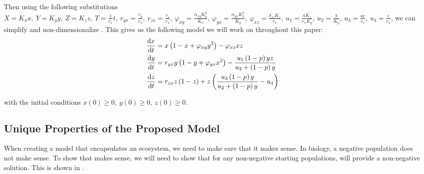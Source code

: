 Then using the following substitutions $X=K_xx,\ Y=K_yy,\ Z=K_zz,\ T=\frac{1}{r_x}t,\ r_{yx}=\frac{r_y}{r_x},\ r_{zx}=\frac{r_z}{r_x},\ \varphi_{xy}=\frac{\alpha_{xy}K_y^2}{K_x},\ \varphi_{yx}=\frac{\alpha_{yx}K_x^2}{K_y},\ \varphi_{xz}=\frac{\delta_{xz}K_z}{r_x},\ u_1=\frac{aK_z}{r_xK_y},\ u_2=\frac{b}{K_y},\ u_3=\frac{ac}{r_x},\ u_4=\frac{e}{r_x}$, we can simplify and non-dimensionalize . This gives us the following model we will work on throughout this paper:
\begin{subequations}\label{model:rayla-ephraim}
    \begin{align}
        \diff[]{x}{t} &= x\left(1-x+\varphi_{xy}y^2\right)-\varphi_{xz}xz
        \label{eq:rayla-ephraim-x}\\
        \diff[]{y}{t} &= r_{yx}y\left(1-y+\varphi_{yx}x^2\right)-\frac{u_1\left(1-p\right)yz}{u_2+\left(1-p\right)y}
        \label{eq:rayla-ephraim-y}\\
        \diff[]{z}{t} &= r_{zx}z\left(1-z\right)+z\left(\frac{u_3\left(1-p\right)y}{u_2+\left(1-p\right)y}-u_4\right)
        \label{eq:rayla-ephraim-z}
    \end{align}
\end{subequations}

with the initial conditions $x(0)\geq 0,\ y(0)\geq 0,\ z(0)\geq 0$.

\subsection{Unique Properties of the Proposed Model}\label{subsec:unique-properties-of-the-proposed-model}
When creating a model that encapsulates an ecosystem, we need to make sure that it makes sense. In biology, a negative population does not make sense. To show that  makes sense, we will need to show that for any non-negative starting populations,  will provide a non-negative solution. This is shown in .


